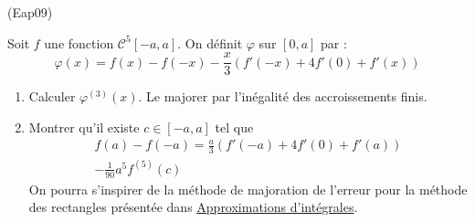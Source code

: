 \begin{tiny}(Eap09)\end{tiny} Soit $f$ une fonction $\mathcal C^5[-a,a]$. On définit $\varphi$ sur $[0,a]$ par :
\begin{displaymath}
 \varphi(x)=
f(x)-f(-x)-\frac{x}{3}\left(f'(-x)+4f'(0)+f'(x) \right) 
\end{displaymath}
\begin{enumerate}
 \item Calculer $\varphi^{(3)}(x)$. Le majorer par l'inégalité des accroissements finis.
 \item Montrer qu'il existe $c\in [-a,a]$ tel que
\begin{multline*}
f(a)-f(-a)
=\frac{a}{3}\left(f'(-a)+4f'(0)+f'(a)\right)\\ -\frac{1}{90}a^5f^{(5)}(c) 
\end{multline*}
On pourra s'inspirer de la méthode de majoration de l'erreur pour la méthode des rectangles présentée dans \href{http://back.maquisdoc.net/data/cours_nicolair/C2196.pdf}{Approximations d'intégrales}.
\end{enumerate}
